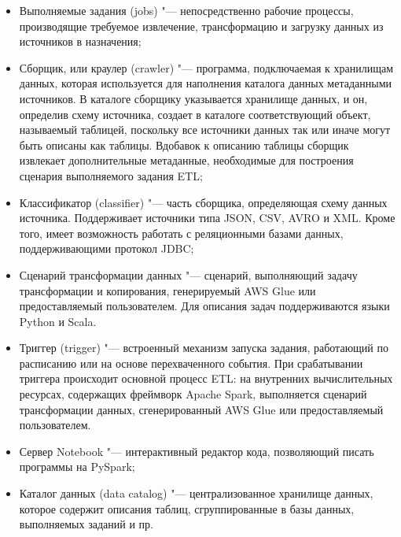 \documentclass[bachelor, och, pract]{SCWorks}
\begin{document}
\begin{itemize}
	\item Выполняемые задания (jobs) "--- непосредственно рабочие процессы, производящие требуемое извлечение, трансформацию и загрузку данных из источников в назначения;
	\item Сборщик, или краулер (crawler) "--- программа, подключаемая к хранилищам данных, которая используется для наполнения каталога данных метаданными источников. В каталоге сборщику указывается хранилище данных, и он, определив схему источника, создает в каталоге соответствующий объект, называемый таблицей, поскольку все источники данных так или иначе могут быть описаны как таблицы. Вдобавок к описанию таблицы сборщик извлекает дополнительные метаданные, необходимые для построения сценария выполняемого задания ETL;
	\item Классификатор (classifier) "--- часть сборщика, определяющая схему данных источника. Поддерживает источники типа JSON, CSV, AVRO и XML. Кроме того, имеет возможность работать с реляционными базами данных, поддерживающими протокол JDBC;
	\item Сценарий трансформации данных "--- сценарий, выполняющий задачу трансформации и копирования, генерируемый AWS Glue или предоставляемый пользователем. Для описания задач поддерживаются языки Python и Scala.
	\item Триггер (trigger) "--- встроенный механизм запуска задания, работающий по расписанию или на основе перехваченного события. При срабатывании триггера происходит основной процесс ETL: на внутренних вычислительных ресурсах, содержащих фреймворк Apache Spark, выполняется сценарий трансформации данных, сгенерированный AWS Glue или предоставляемый пользователем.
	\item Сервер Notebook "--- интерактивный редактор кода, позволяющий писать программы на PySpark;
	\item Каталог данных (data catalog) "--- централизованное хранилище данных, которое содержит описания таблиц, сгруппированные в базы данных, выполняемых заданий и пр.
\end{itemize}
\end{document}
